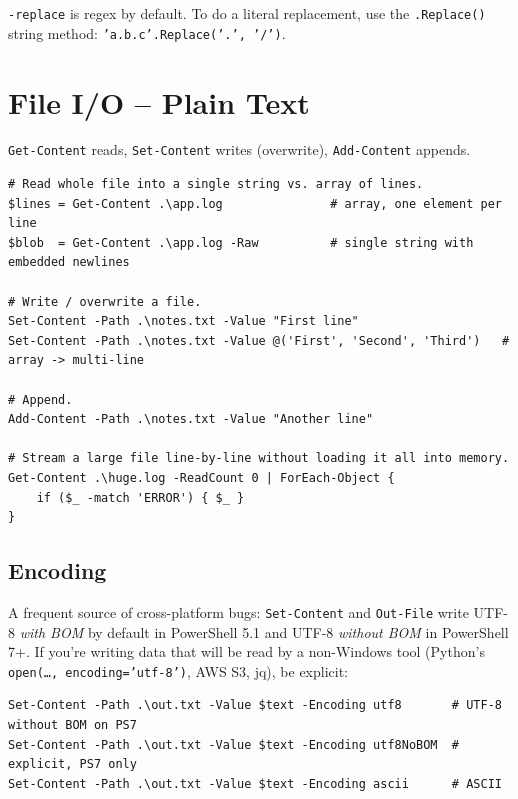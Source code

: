 \documentclass[11pt,a4paper]{article}
\newcommand{\cmd}[1]{\texttt{\textcolor{pwshKw}{#1}}}
\begin{document}
\begin{compare}
\texttt{-replace} is regex by default. To do a literal replacement,
use the \texttt{.Replace()} string method:
\texttt{'a.b.c'.Replace('.', '/')}.
\end{compare}

\section{File I/O -- Plain Text}

\cmd{Get-Content} reads, \cmd{Set-Content} writes (overwrite),
\cmd{Add-Content} appends.

\begin{lstlisting}[style=pwshstyle]
# Read whole file into a single string vs. array of lines.
$lines = Get-Content .\app.log               # array, one element per line
$blob  = Get-Content .\app.log -Raw          # single string with embedded newlines

# Write / overwrite a file.
Set-Content -Path .\notes.txt -Value "First line"
Set-Content -Path .\notes.txt -Value @('First', 'Second', 'Third')   # array -> multi-line

# Append.
Add-Content -Path .\notes.txt -Value "Another line"

# Stream a large file line-by-line without loading it all into memory.
Get-Content .\huge.log -ReadCount 0 | ForEach-Object {
    if ($_ -match 'ERROR') { $_ }
}
\end{lstlisting}

\subsection*{Encoding}

A frequent source of cross-platform bugs: \cmd{Set-Content} and
\cmd{Out-File} write UTF-8 \emph{with BOM} by default in PowerShell 5.1
and UTF-8 \emph{without BOM} in PowerShell 7+. If you're writing data
that will be read by a non-Windows tool (Python's
\texttt{open(\dots, encoding='utf-8')}, AWS S3, jq), be explicit:

\begin{lstlisting}[style=pwshstyle]
Set-Content -Path .\out.txt -Value $text -Encoding utf8       # UTF-8 without BOM on PS7
Set-Content -Path .\out.txt -Value $text -Encoding utf8NoBOM  # explicit, PS7 only
Set-Content -Path .\out.txt -Value $text -Encoding ascii      # ASCII
\end{lstlisting}
\end{document}

